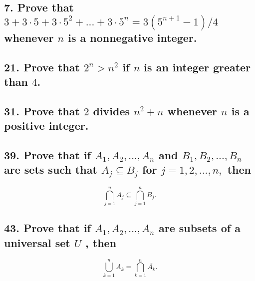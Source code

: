 \documentclass[11pt, oneside]{article} %
\numberwithin{equation}{section} %
\numberwithin{figure}{section} %
\numberwithin{table}{section} %
\begin{document}
\subsection{7. Prove that $3+3\cdot 5+3 \cdot 5^2+...+3 \cdot 5^n=3(5^{n+1} -1)/4$ whenever $n$ is a nonnegative integer.
}


\subsection{21. Prove that $2^n > n^2$ if $n$ is an integer greater than $4$.}


\subsection{31. Prove that $2$ divides $n^2 + n$ whenever $n$ is a positive integer.}

\subsection{39. Prove that if $A_1,A_2,...,A_n$ and $B_1,B_2,...,B_n$ are sets such that $A_j \subseteq B_j$ for $j = 1,2,...,n,$ then}
\begin{displaymath}
 \displaystyle\bigcap^n_{j = 1} A_j \subseteq \bigcap^n_{j = 1} B_j.
\end{displaymath}

\subsection{43. Prove that if $A_1, A_2,..., A_n$ are subsets of a universal set $U$ , then}
\begin{displaymath}
 \displaystyle\bigcup^n_{k = 1} A_k = \bigcap^n_{k = 1} \overline{A_k}.
\end{displaymath}
\end{document}
